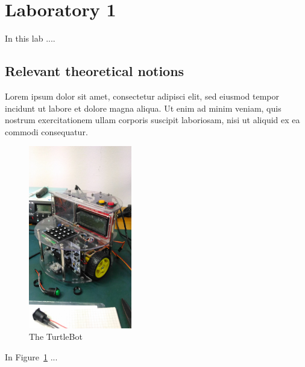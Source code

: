 \documentclass[english]{article}
\begin{document}
\tableofcontents
\newpage

\section{Laboratory 1}

In this lab ....

\subsection{Relevant theoretical notions}

Lorem ipsum dolor sit amet, consectetur adipisci elit, sed eiusmod tempor incidunt ut labore et dolore magna aliqua. Ut enim ad minim veniam, quis nostrum exercitationem ullam corporis suscipit laboriosam, nisi ut aliquid ex ea commodi consequatur.

\begin{figure}[!h]
	\centering
	\includegraphics[width=0.4\textwidth]{figures/turtlebot_1.jpg}
	\caption{The TurtleBot}
	\label{fig:turtlebot}
\end{figure}

In Figure~\ref{fig:turtlebot} ...
\end{document}
